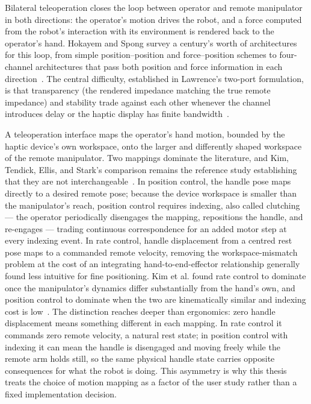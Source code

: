 Bilateral teleoperation closes the loop between operator and remote manipulator in both directions: the operator's motion drives the robot, and a force computed from the robot's interaction with its environment is rendered back to the operator's hand. Hokayem and Spong survey a century's worth of architectures for this loop, from simple position--position and force--position schemes to four-channel architectures that pass both position and force information in each direction~\cite{hokayem2006bilateral}. The central difficulty, established in Lawrence's two-port formulation, is that transparency (the rendered impedance matching the true remote impedance) and stability trade against each other whenever the channel introduces delay or the haptic display has finite bandwidth~\cite{lawrence1993stability}.

\label{sec:sota-mappings}
\begin{sloppypar}
A teleoperation interface maps the operator's hand motion, bounded by the haptic device's own workspace, onto the larger and differently shaped workspace of the remote manipulator. Two mappings dominate the literature, and Kim, Tendick, Ellis, and Stark's comparison remains the reference study establishing that they are not interchangeable~\cite{kim1987comparison}. In position control, the handle pose maps directly to a desired remote pose; because the device workspace is smaller than the manipulator's reach, position control requires indexing, also called clutching --- the operator periodically disengages the mapping, repositions the handle, and re-engages --- trading continuous correspondence for an added motor step at every indexing event. In rate control, handle displacement from a centred rest pose maps to a commanded remote velocity, removing the workspace-mismatch problem at the cost of an integrating hand-to-end-effector relationship generally found less intuitive for fine positioning. Kim et al. found rate control to dominate once the manipulator's dynamics differ substantially from the hand's own, and position control to dominate when the two are kinematically similar and indexing cost is low~\cite{kim1987comparison}. The distinction reaches deeper than ergonomics: zero handle displacement means something different in each mapping. In rate control it commands zero remote velocity, a natural rest state; in position control with indexing it can mean the handle is disengaged and moving freely while the remote arm holds still, so the same physical handle state carries opposite consequences for what the robot is doing. This asymmetry is why this thesis treats the choice of motion mapping as a factor of the user study rather than a fixed implementation decision.
\end{sloppypar}


